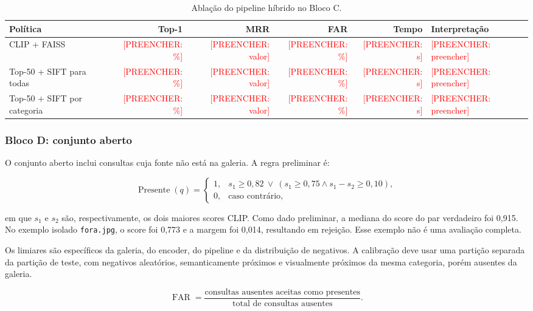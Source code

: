 \documentclass[12pt]{article}
\newcommand{\todo}[1]{\textcolor{red}{[PREENCHER: #1]}}
\begin{document}
\begin{table}[H]
\centering
\caption{Ablação do pipeline híbrido no Bloco C.}
\label{tab:ablacao-c}
\begin{tabularx}{\linewidth}{Y r r r r Y}
\toprule
\textbf{Política} & \textbf{Top-1} & \textbf{MRR} & \textbf{FAR} &
\textbf{Tempo} & \textbf{Interpretação}\\
\midrule
CLIP + FAISS & \todo{\%} & \todo{valor} & \todo{\%} & \todo{s} &
\todo{preencher}\\
Top-50 + SIFT para todas & \todo{\%} & \todo{valor} & \todo{\%} & \todo{s} &
\todo{preencher}\\
Top-50 + SIFT por categoria & \todo{\%} & \todo{valor} & \todo{\%} & \todo{s} &
\todo{preencher}\\
\bottomrule
\end{tabularx}
\end{table}

\subsubsection{Bloco D: conjunto aberto}

O conjunto aberto inclui consultas cuja fonte não está na galeria. A regra
preliminar é:

\begin{equation}
\operatorname{Presente}(q)=
\begin{cases}
1,&s_1\geq0{,}82\ \lor\
(s_1\geq0{,}75\land s_1-s_2\geq0{,}10),\\
0,&\text{caso contrário},
\end{cases}
\label{eq:presenca}
\end{equation}

em que $s_1$ e $s_2$ são, respectivamente, os dois maiores scores CLIP.
Como dado preliminar, a mediana do score do par verdadeiro foi 0,915. No
exemplo isolado \texttt{fora.jpg}, o score foi 0,773 e a margem foi 0,014,
resultando em rejeição. Esse exemplo não é uma avaliação completa.

Os limiares são específicos da galeria, do encoder, do pipeline e da
distribuição de negativos. A calibração deve usar uma partição separada da
partição de teste, com negativos aleatórios, semanticamente próximos e
visualmente próximos da mesma categoria, porém ausentes da galeria.

\begin{equation}
\operatorname{FAR}=
\frac{\text{consultas ausentes aceitas como presentes}}
{\text{total de consultas ausentes}}.
\label{eq:far}
\end{equation}
\end{document}
